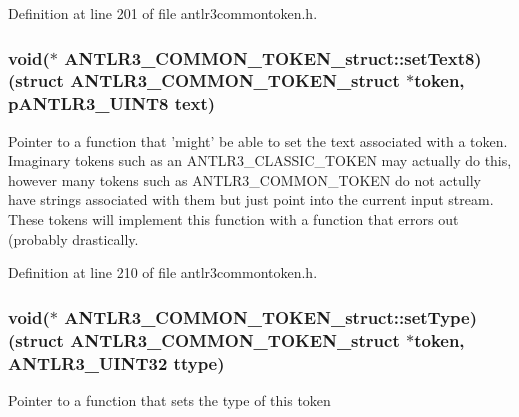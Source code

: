 Definition at line 201 of file antlr3commontoken.\-h.

\hypertarget{struct_a_n_t_l_r3___c_o_m_m_o_n___t_o_k_e_n__struct_a80b182f3520f42844ecc2ecbfaae7c1a}{
\subsubsection[{set\-Text8}]{\setlength{\rightskip}{0pt plus 5cm}void($\ast$ A\-N\-T\-L\-R3\-\_\-\-C\-O\-M\-M\-O\-N\-\_\-\-T\-O\-K\-E\-N\-\_\-struct\-::set\-Text8)(struct {\bf A\-N\-T\-L\-R3\-\_\-\-C\-O\-M\-M\-O\-N\-\_\-\-T\-O\-K\-E\-N\-\_\-struct} $\ast$token, {\bf p\-A\-N\-T\-L\-R3\-\_\-\-U\-I\-N\-T8} {\bf text})}}\label{struct_a_n_t_l_r3___c_o_m_m_o_n___t_o_k_e_n__struct_a80b182f3520f42844ecc2ecbfaae7c1a}
Pointer to a function that 'might' be able to set the text associated with a token. Imaginary tokens such as an A\-N\-T\-L\-R3\-\_\-\-C\-L\-A\-S\-S\-I\-C\-\_\-\-T\-O\-K\-E\-N may actually do this, however many tokens such as A\-N\-T\-L\-R3\-\_\-\-C\-O\-M\-M\-O\-N\-\_\-\-T\-O\-K\-E\-N do not actully have strings associated with them but just point into the current input stream. These tokens will implement this function with a function that errors out (probably drastically. 

Definition at line 210 of file antlr3commontoken.\-h.

\hypertarget{struct_a_n_t_l_r3___c_o_m_m_o_n___t_o_k_e_n__struct_a589c65c971df84b86e2455f41f925338}{
\subsubsection[{set\-Type}]{\setlength{\rightskip}{0pt plus 5cm}void($\ast$ A\-N\-T\-L\-R3\-\_\-\-C\-O\-M\-M\-O\-N\-\_\-\-T\-O\-K\-E\-N\-\_\-struct\-::set\-Type)(struct {\bf A\-N\-T\-L\-R3\-\_\-\-C\-O\-M\-M\-O\-N\-\_\-\-T\-O\-K\-E\-N\-\_\-struct} $\ast$token, {\bf A\-N\-T\-L\-R3\-\_\-\-U\-I\-N\-T32} ttype)}}\label{struct_a_n_t_l_r3___c_o_m_m_o_n___t_o_k_e_n__struct_a589c65c971df84b86e2455f41f925338}
Pointer to a function that sets the type of this token 

